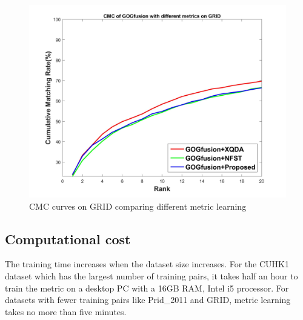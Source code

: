 \documentclass[10pt,twocolumn,letterpaper]{article}
\begin{document}
\begin{figure}
\begin{raggedleft}
\includegraphics[width=1\linewidth]{GRID.jpg}
\vspace{-2em}
\caption{CMC curves on GRID comparing different metric learning}
\end{raggedleft}
\end{figure}

\subsection{Computational cost}
The training time increases when the dataset size increases. For the CUHK1 dataset which has the largest number of training pairs, it takes half an hour to train the metric on a desktop PC with a 16GB RAM, Intel i5 processor. For datasets with fewer training pairs like Prid\_2011 and GRID, metric learning takes no more than five minutes.
\end{document}
